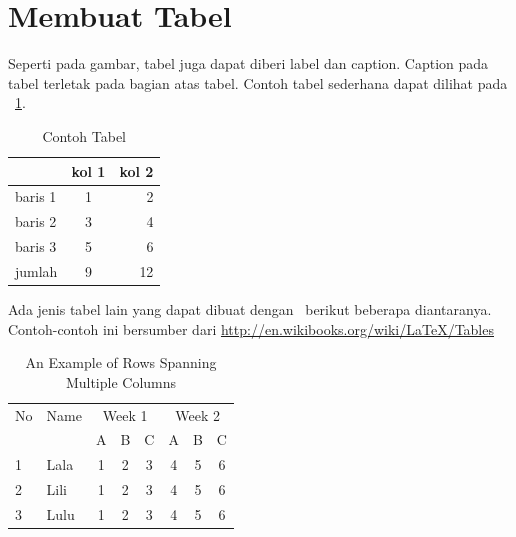 	\section{Membuat Tabel}
	Seperti pada gambar, tabel juga dapat diberi label dan caption.
	Caption pada tabel terletak pada bagian atas tabel.
	Contoh tabel sederhana dapat dilihat pada \tab~\ref{tab:tab1}.

	\begin{table}
		\centering
		\caption{Contoh Tabel}
		\label{tab:tab1}
		\begin{tabular}{| l | c r |}
			\hline
			        & kol 1 & kol 2 \\
			\hline
			baris 1 & 1     & 2     \\
			baris 2 & 3     & 4     \\
			baris 3 & 5     & 6     \\
			jumlah  & 9     & 12    \\
			\hline
		\end{tabular}
	\end{table}

	Ada jenis tabel lain yang dapat dibuat dengan \latex~berikut
	beberapa diantaranya.
	Contoh-contoh ini bersumber dari
	\url{http://en.wikibooks.org/wiki/LaTeX/Tables}

	\begin{table}
		\centering
		\caption{An Example of Rows Spanning Multiple Columns}
		\label{row.spanning}
		\begin{tabular}{|l|l|*{6}{c|}}
			\hline %
			No & Name & \multicolumn{3}{|c|}{Week 1} & \multicolumn{3}{|c|}{Week 2}                 \\
			\cline{3-8} %
			   &      & A                            & B                            & C & A & B & C \\
			\hline
			1  & Lala & 1                            & 2                            & 3 & 4 & 5 & 6 \\
			2  & Lili & 1                            & 2                            & 3 & 4 & 5 & 6 \\
			3  & Lulu & 1                            & 2                            & 3 & 4 & 5 & 6 \\
			\hline
		\end{tabular}
	\end{table}

